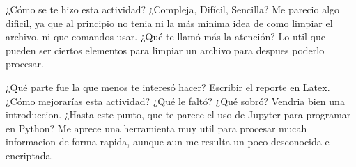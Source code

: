 \documentclass[a4paper]{article}
\begin{document}
    ¿Cómo se te hizo esta actividad? ¿Compleja, Difícil, Sencilla?
    \linebreak
    Me parecio algo dificil, ya que al principio no tenia ni la más minima idea de como limpiar el archivo, ni que comandos usar.
    \linebreak
    ¿Qué te llamó más la atención?
    \linebreak
    Lo util que pueden ser ciertos elementos para limpiar un archivo para despues poderlo procesar.
    \linebreak
  
    ¿Qué parte fue la que menos te interesó hacer?
    \linebreak
    Escribir el reporte en Latex.
    \linebreak
    ¿Cómo mejorarías esta actividad? ¿Qué le faltó? ¿Qué sobró?
    \linebreak
    Vendria bien una introduccion.
    \linebreak
    ¿Hasta este punto, que te parece el uso de Jupyter para programar en Python?
    \linebreak
    Me aprece una herramienta muy util para procesar mucah informacion de forma rapida, aunque aun me resulta un poco desconocida e encriptada.
\end{document}
